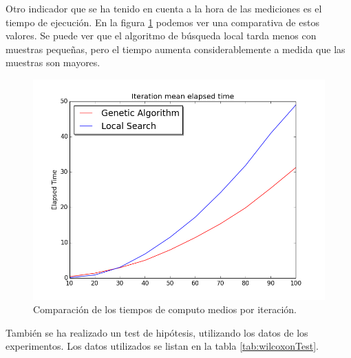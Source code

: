 \documentclass[10pt,a4paper]{article}
\begin{document}
Otro indicador que se ha tenido en cuenta a la hora de las mediciones es el tiempo de ejecución. En la figura \ref{fig:timeComparison} podemos ver una comparativa de estos valores. Se puede ver que el algoritmo de búsqueda local tarda menos con muestras pequeñas, pero el tiempo aumenta considerablemente a medida que las muestras son mayores.

\begin{figure}[h]
\centering
\includegraphics[scale=0.4]{elapsedTime.png} 
\caption{Comparación de los tiempos de computo medios por iteración.}
\label{fig:timeComparison}
\end{figure}

También se ha realizado un test de hipótesis, utilizando los datos de los experimentos. Los datos utilizados se listan en la tabla \ref{tab:wilcoxonTest}.
\end{document}
